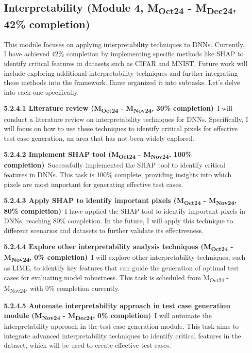 \subsection{Interpretability (Module 4, M\textsubscript{Oct24} - M\textsubscript{Dec24}, 42\% completion)} This module focuses on applying interpretability techniques to DNNs. Currently, I have achieved 42\% completion by implementing specific methods like SHAP to identify critical features in datasets such as CIFAR and MNIST. Future work will include exploring additional interpretability techniques and further integrating these methods into the framework. Ihave organized it into subtasks. Let's delve into each one specifically.

\noindent \textbf{5.2.4.1 Literature review (M\textsubscript{Oct24} - M\textsubscript{Nov24}, 30\% completion)}\  I will conduct a literature review on interpretability techniques for DNNs. Specifically, I will focus on how to use these techniques to identify critical pixels for effective test case generation, an area that has not been widely explored.

\noindent \textbf{5.2.4.2 Implement SHAP tool (M\textsubscript{Oct24} - M\textsubscript{Nov24}, 100\% completion)}\ Successfully implemented the SHAP tool to identify critical features in DNNs. This task is 100\% complete, providing insights into which pixels are most important for generating effective test cases.

\noindent \textbf{5.2.4.3 Apply SHAP to identify important pixels (M\textsubscript{Oct24} - M\textsubscript{Nov24}, 80\% completion)}\ I have applied the SHAP tool to identify important pixels in DNNs, reaching 80\% completion. In the future, I will apply this technique to different scenarios and datasets to further validate its effectiveness.


\noindent \textbf{5.2.4.4 Explore other interpretability analysis techniques (M\textsubscript{Oct24} - M\textsubscript{Nov24}, 0\% completion)}\ I will explore other interpretability techniques, such as LIME, to identify key features that can guide the generation of optimal test cases for evaluating model robustness. This task is scheduled from M\textsubscript{Oct24} - M\textsubscript{Nov24}, with 0\% completion currently.


\noindent \textbf{5.2.4.5 Automate interpretability approach in test case generation module (M\textsubscript{Nov24} - M\textsubscript{Dec24}, 0\% completion)}\  I will automate the interpretability approach in the test case generation module. This task aims to integrate advanced interpretability techniques to identify critical features in the dataset, which will be used to create effective test cases.

